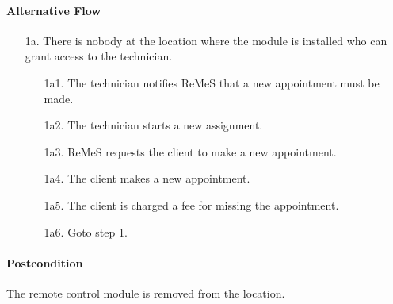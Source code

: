 \paragraph{Alternative Flow}
\begin{enumerate}
	\item[1a.] There is nobody at the location where the module is installed who can grant access to the technician.
	\begin{enumerate}
		\item[1a1.] The technician notifies ReMeS that a new appointment must be made.
		\item[1a2.] The technician starts a new assignment.
		\item[1a3.] ReMeS requests the client to make a new appointment.
		\item[1a4.] The client makes a new appointment.
		\item[1a5.] The client is charged a fee for missing the appointment.
		\item[1a6.] Goto step 1.
	\end{enumerate}
\end{enumerate}

\paragraph{Postcondition}
The remote control module is removed from the location.
